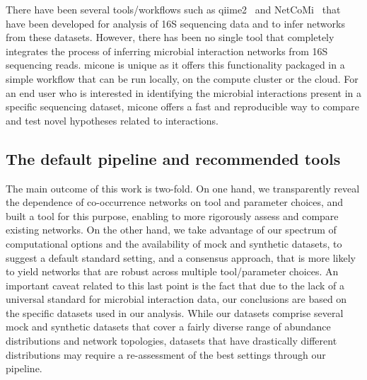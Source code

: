   There have been several tools/workflows such as \ac{qiime2}~\cite{bolyenReproducibleInteractiveScalable2019} and NetCoMi~\cite{peschelNetCoMiNetworkConstruction2020} that have been developed for analysis of 16S sequencing data and to infer networks from these datasets.
  However, there has been no single tool that completely integrates the process of inferring microbial interaction networks from 16S sequencing reads.
  \ac{micone} is unique as it offers this functionality packaged in a simple workflow that can be run locally, on the compute cluster or the cloud.
  For an end user who is interested in identifying the microbial interactions present in a specific sequencing dataset, \ac{micone} offers a fast and reproducible way to compare and test novel hypotheses related to interactions.

  \subsection*{The default pipeline and recommended tools}

  The main outcome of this work is two-fold.
  On one hand, we transparently reveal the dependence of co-occurrence networks on tool and parameter choices, and built a tool for this purpose, enabling to more rigorously assess and compare existing networks.
  On the other hand, we take advantage of our spectrum of computational options and the availability of mock and synthetic datasets, to suggest a default standard setting, and a consensus approach, that is more likely to yield networks that are robust across multiple tool/parameter choices.
  An important caveat related to this last point is the fact that due to the lack of a universal standard for microbial interaction data, our conclusions are based on the specific datasets used in our analysis.
  While our datasets comprise several mock and synthetic datasets that cover a fairly diverse range of abundance distributions and network topologies, datasets that have drastically different distributions may require a re-assessment of the best settings through our pipeline.

